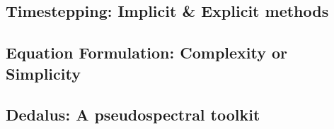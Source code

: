 \subsection{Timestepping: Implicit \& Explicit methods}

\subsection{Equation Formulation: Complexity or Simplicity}

\subsection{Dedalus: A pseudospectral toolkit}
\label{sct:dedalus}


